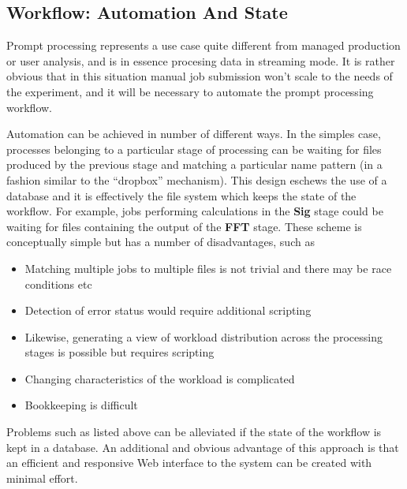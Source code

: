 \documentclass[pdftex,12pt,letter]{article}
\begin{document}
\subsection{Workflow: Automation And State}

Prompt processing represents a use case quite different from managed production or user analysis, and is 
in essence procesing data in streaming mode. It is rather obvious that in this situation manual job submission won't scale to the
needs of the experiment, and it will be necessary to automate the prompt processing workflow.

Automation can be achieved in  number of different ways. In the simples case, processes belonging to a particular stage
of processing can be waiting for files produced by the previous stage and matching a particular name pattern
(in a fashion similar to the ``dropbox'' mechanism). This design eschews the use of a database and it is effectively
the file system which keeps the state of the workflow. For example, jobs performing calculations in the \textbf{Sig}
stage could be waiting for files containing the output of the \textbf{FFT} stage. These scheme is conceptually simple but has a number of
disadvantages, such as
\begin{itemize}
\item Matching multiple jobs to multiple files is not trivial and there may be race conditions etc
\item Detection of error status would require additional scripting
\item Likewise, generating a view of workload distribution across the processing stages is possible but requires
scripting
\item Changing characteristics of the workload is complicated
\item Bookkeeping is difficult
\end{itemize}

\noindent Problems such as listed above can be alleviated if the state of the workflow is kept in a database.
An additional and obvious advantage of this approach is that an efficient and responsive Web interface to
the system can be created with minimal effort.
\end{document}

